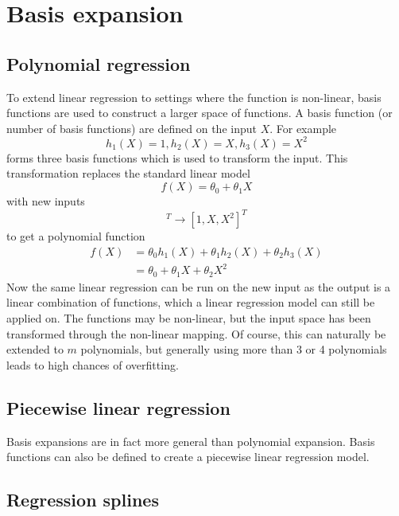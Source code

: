 \documentclass[CS5104-Notes.tex]{subfiles}
\begin{document}
\section{Basis expansion}

\subsection{Polynomial regression}
To extend linear regression to settings where the function is non-linear, basis functions are used to construct a larger space of functions. A basis function (or number of basis functions) are defined on the input $X$. For example
\begin{equation}
h_{1}(X) = 1, h_{2}(X) = X, h_{3}(X) = X^{2}
\end{equation}
forms three basis functions which is used to transform the input. This transformation replaces the standard linear model
\begin{equation}
f(X) = \theta_{0} + \theta_{1}X
\end{equation}
with new inputs
\begin{equation}
[h_{1}(X), h_{2}(X), h_{3}(X)]^{T} \rightarrow [1,X,X^{2}]^{T}
\end{equation}
to get a polynomial function
\begin{align}
f(X) &= \theta_{0}h_{1}(X) + \theta_{1}h_{2}(X) + \theta_{2}h_{3}(X) \\
 &= \theta_{0} + \theta_{1}X + \theta_{2}X^{2}
\end{align}
Now the same linear regression can be run on the new input as the output is a linear combination of functions, which a linear regression model can still be applied on. The functions may be non-linear, but the input space has been transformed through the non-linear mapping. Of course, this can naturally be extended to $m$ polynomials, but generally using more than 3 or 4 polynomials leads to high chances of overfitting.

\subsection{Piecewise linear regression}
Basis expansions are in fact more general than polynomial expansion. Basis functions can also be defined to create a piecewise linear regression model. 

\subsection{Regression splines}
\end{document}
